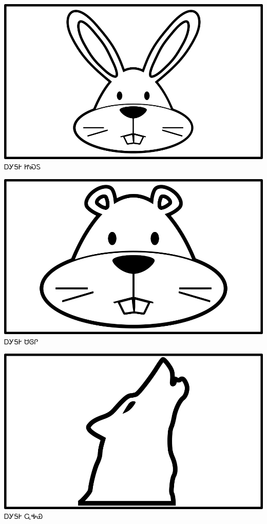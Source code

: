 \documentclass[avery5371]{flashcards}%
\begin{document}
    \begin{flashcard}{
        \includegraphics[width=0.95\columnwidth,height=.51\columnwidth,keepaspectratio]{../artwork/objects-animate/jisdu}
    }
        \Huge ᎠᎩᎦᎨ ᏥᏍᏚ
    \end{flashcard}

    \begin{flashcard}{
        \includegraphics[width=0.95\columnwidth,height=.51\columnwidth,keepaspectratio]{../artwork/objects-animate/saloli}
    }
        \Huge ᎠᎩᎦᎨ ᏌᎶᎵ
    \end{flashcard}

    \begin{flashcard}{
        \includegraphics[width=0.95\columnwidth,height=.51\columnwidth,keepaspectratio]{../artwork/objects-animate/wahya}
    }
        \Huge ᎠᎩᎦᎨ ᏩᎭᏯ
    \end{flashcard}
\end{document}

